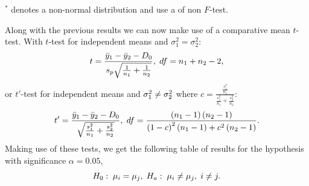 \begin{frame}
\vspace{2mm}
${}^*$ denotes a non-normal distribution and use a of non $F$-test. 
\end{frame}

\begin{frame}
Along with the previous results we can now make use of a comparative mean $t$-test. With $t$-test for independent means and $\sigma^2_1=\sigma^2_2$:
$$t=\frac{\bar{y}_1-\bar{y}_2-D_0}{s_p\sqrt{\frac{1}{n_1}+\frac{1}{n_2}}},\hspace{1mm}df=n_1+n_2-2,$$
or $t'$-test for independent means and $\sigma^2_1\centernot{=}\sigma^2_2$ where $c=\frac{\frac{s^2_1}{n_1}}{\frac{s^2_1}{n_1}+\frac{s^2_2}{n_2}}$:
$$t'=\frac{\bar{y}_1-\bar{y}_2-D_0}{\sqrt{\frac{s^2_1}{n_1}+\frac{s^2_2}{n_2}}},\hspace{1mm}df=\frac{\left(n_1-1\right)\left(n_2-1\right)}{\left(1-c\right)^2\left(n_1-1\right)+c^2\left(n_2-1\right)}.$$
Making use of these tests, we get the following table of results for the hypothesis with significance $\alpha=0.05$,
$$H_0:\hspace{1mm}\mu_i=\mu_j,\hspace{1mm}H_a:\hspace{1mm}\mu_i\centernot{=}\mu_j,\hspace{1mm}i\centernot{=}j.$$
\end{frame}

